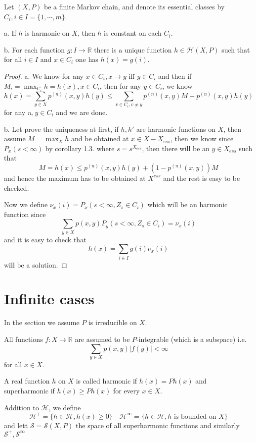 \documentclass[lang=en, color=blue, ]{elegantbook}
\newcommand{\R}{\mathbb{R}}
\newcommand{\Har}{\mathcal{H}}
\newcommand{\Sar}{\mathcal{S}}
\begin{document}
\begin{theorem}
    Let $(X,P)$ be a finite Markov chain, and denote its essential classes by $C_i, i\in I=\{1,\cdots,m\}$.\par
    a. If $h$ is harmonic on $X$, then $h$ is constant on each $C_i$.\par
    b. For each function $g:I\to\R$ there is a unique function $h\in\Har(X,P)$ such that for all $i\in I$ and $x\in C_i$ one has $h(x) = g(i)$.
\end{theorem}
\begin{proof}
    a. We know for any $x\in C_i, x\to y$ iff $y\in C_i$ and then if $M_i = \max_{C_i} h = h(x), x\in C_i$, then for any $y\in C_i$, we know
    \[
    h(x) = \sum\limits_{y\in X}p^{(n)}(x,y)h(y) \leq \sum\limits_{v\in C_i,v\neq y}p^{(n)}(x,y) M + p^{(n)}(x,y)h(y)
    \]
    for any $n,y\in C_i$ and we are done.\par
    b. Let prove the uniqueness at first, if $h,h'$ are harmonic functions on $X$, then assume $M = \max_{X}h$ and be obtained at $x \in X - X_{ess}$, then we know since $P_x(s<\infty)$ by corollary 1.3. where $s = s^{X_{ess}}$, then there will be an $y\in X_{ess}$ such that
    \[
    M = h(x) \leq p^{(n)}(x,y)h(y)+(1-p^{(n)}(x,y))M
    \] 
    and hence the maximum has to be obtained at $X^{ess}$ and the rest is easy to be checked.\par
    Now we define $\nu_x(i) = P_x(s<\infty, Z_s \in C_i)$ which will be an harmonic function since
    \[
    \sum\limits_{y\in X}p(x,y)P_y(s<\infty, Z_s\in C_i) = \nu_x(i)
    \]
    and it is easy to check that
    \[h(x) = \sum\limits_{i\in I}g(i)\nu_x(i)\]
    will be a solution.
\end{proof} 

\section{Infinite cases}

In the section we assume $P$ is irreducible on $X$.

\begin{definition}
    All functions $f:X\to\R$ are assumed to be $P$-integrable (which is a subspace) i.e.
    \[
    \sum\limits_{y\in X}p(x,y)|f(y)| < \infty
    \]
    for all $x\in X$.\par
    A real function $h$ on $X$ is called harmonic if $h(x) = Ph(x)$ and superharmonic if $h(x) \geq Ph(x)$ for every $x\in X$.\par
    Addition to $\Har$, we define
    \[
    \Har^+ = \{h\in \Har, h(x)\geq 0\}\quad \Har^{\infty} = \{h \in \Har, h\text{ is bounded on }X\}
    \]
    and lett $\Sar = \Sar (X,P)$ the space of all superharmonic functions and similarly $\Sar^+,\Sar^{\infty}$
\end{definition}
\end{document}
